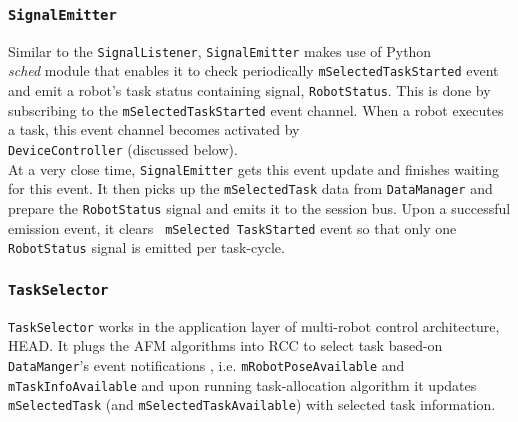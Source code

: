 \subsubsection*{\texttt{SignalEmitter}}
Similar to the \texttt{SignalListener}, \texttt{SignalEmitter} makes use of Python\\ {\em sched} module that enables it to check periodically \texttt{mSelectedTaskStarted} event and emit a robot's task status containing signal, \texttt{RobotStatus}.  This is done by subscribing to the  \texttt{mSelectedTaskStarted} event channel. When a robot executes a task, this event channel becomes  activated by\\ \texttt{DeviceController} (discussed below).\\ At a very close time, \texttt{SignalEmitter} gets this event update and finishes waiting for this event. It then picks up the \texttt{mSelectedTask} data from \texttt{DataManager} and prepare the \texttt{RobotStatus} signal and emits it to the session bus. Upon a successful emission event, it clears \texttt{ mSelected TaskStarted} event so that only one \texttt{RobotStatus}  signal is emitted per task-cycle.
\subsubsection*{\texttt{TaskSelector}}
\texttt{TaskSelector} works in the application layer of multi-robot control architecture, HEAD. It plugs the AFM algorithms into RCC to select task based-on \texttt{DataManger}'s event notifications , i.e. \texttt{mRobotPoseAvailable} and\\ \texttt{mTaskInfoAvailable} and upon running task-allocation algorithm it updates  \texttt{mSelectedTask} (and \texttt{mSelectedTaskAvailable}) with selected task information.

